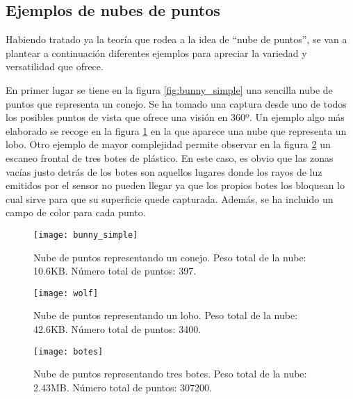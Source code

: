 \subsection{Ejemplos de nubes de puntos}
Habiendo tratado ya la teoría que rodea a la idea de ``nube de puntos'', se van a plantear a continuación diferentes ejemplos para apreciar la variedad y versatilidad que ofrece.

En primer lugar se tiene en la figura \ref{fig:bunny_simple} una sencilla nube de puntos que representa un conejo. Se ha tomado una captura desde uno de todos los posibles puntos de vista que ofrece una visión en 360º.
Un ejemplo algo más elaborado se recoge en la figura \ref{fig:wolf} en la que aparece una nube que representa un lobo. 
Otro ejemplo de mayor complejidad permite observar en la figura \ref{fig:botes_grande} un escaneo frontal de tres botes de plástico. En este caso, es obvio que las zonas vacías justo detrás de los botes son aquellos lugares donde los rayos de luz emitidos por el sensor no pueden llegar ya que los propios botes los bloquean lo cual sirve para que su superficie quede capturada. Además, se ha incluido un campo de color para cada punto.


\begin{figure}[!htb]
  \texttt{[image: bunny\_simple]}
  \caption{Nube de puntos representando un conejo.
  Peso total de la nube: 10.6KB.
  Número total de puntos: 397.}\label{fig:bunny_simple}
\endminipage\hfill
{}
  \texttt{[image: wolf]}
  \caption{Nube de puntos representando un lobo.
  Peso total de la nube: 42.6KB.
  Número total de puntos: 3400.}\label{fig:wolf}
\endminipage\hfill

\end{figure}

\begin{figure}
\centering
\texttt{[image: botes]}
  \caption{Nube de puntos representando tres botes.
  Peso total de la nube: 2.43MB.
  Número total de puntos: 307200.}\label{fig:botes_grande}
\end{figure}



